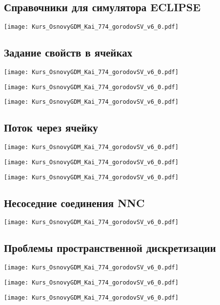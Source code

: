 \documentclass[main.tex]{subfiles}
\begin{document}
\subsection{Справочники для симулятора ECLIPSE}

\texttt{[image: Kurs\_OsnovyGDM\_Kai\_774\_gorodovSV\_v6\_0.pdf]}

\subsection{Задание свойств в ячейках}

\texttt{[image: Kurs\_OsnovyGDM\_Kai\_774\_gorodovSV\_v6\_0.pdf]}

\texttt{[image: Kurs\_OsnovyGDM\_Kai\_774\_gorodovSV\_v6\_0.pdf]}

\texttt{[image: Kurs\_OsnovyGDM\_Kai\_774\_gorodovSV\_v6\_0.pdf]}

\subsection{Поток через ячейку}

\texttt{[image: Kurs\_OsnovyGDM\_Kai\_774\_gorodovSV\_v6\_0.pdf]}

\texttt{[image: Kurs\_OsnovyGDM\_Kai\_774\_gorodovSV\_v6\_0.pdf]}

\texttt{[image: Kurs\_OsnovyGDM\_Kai\_774\_gorodovSV\_v6\_0.pdf]}

\subsection{Несоседние соединения NNC}

\texttt{[image: Kurs\_OsnovyGDM\_Kai\_774\_gorodovSV\_v6\_0.pdf]}

\subsection{Проблемы пространственной дискретизации}

\texttt{[image: Kurs\_OsnovyGDM\_Kai\_774\_gorodovSV\_v6\_0.pdf]}

\texttt{[image: Kurs\_OsnovyGDM\_Kai\_774\_gorodovSV\_v6\_0.pdf]}

\texttt{[image: Kurs\_OsnovyGDM\_Kai\_774\_gorodovSV\_v6\_0.pdf]}
\end{document}
